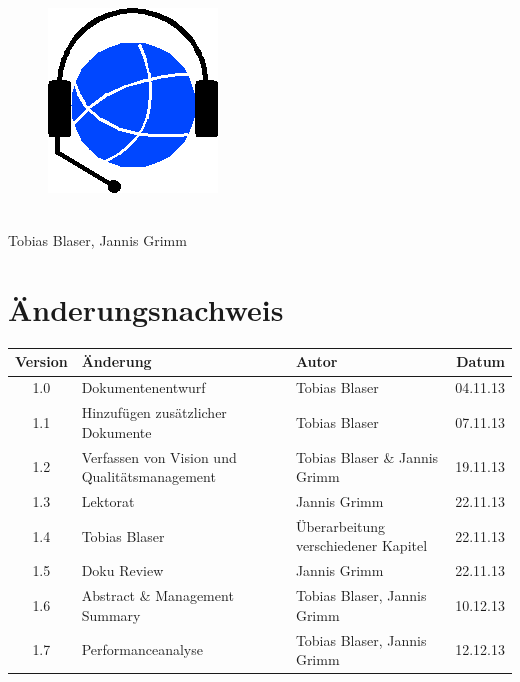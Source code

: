 
\usepackage{csvsimple}

\providecommand{\documentType}{Projektdokumentation}
\providecommand{\versionnumber}{1.7}



\thispagestyle{empty}
\begin{titlepage}
	\begin{center}

	\vspace*{40mm}
	
	\begin{figure}[htp]
		\centering
		\includegraphics[scale=0.60]{../img/icon-js-voip.png}
	\end{figure}		
	\vspace*{20mm}
	
	{\fontsize{40}{48} \selectfont \project \\[10mm]}
	\vspace*{20mm}
	Tobias Blaser, Jannis Grimm

\end{center}
\end{titlepage}
\clearpage

\chapter*{Änderungsnachweis}
\begin{tabularx}{\textwidth}{|cXlr|} %
		\hline
		\textbf{Version} & \textbf{Änderung} & \textbf{Autor} & \textbf{Datum}\\
		\hline
		1.0 & Dokumentenentwurf & Tobias Blaser & 04.11.13\\
		1.1 & Hinzufügen zusätzlicher Dokumente & Tobias Blaser & 07.11.13\\
		1.2 & Verfassen von Vision und Qualitätsmanagement & Tobias Blaser \& Jannis Grimm & 19.11.13\\
		1.3 & Lektorat & Jannis Grimm & 22.11.13\\
		1.4 & Tobias Blaser & Überarbeitung verschiedener Kapitel & 22.11.13\\
		1.5 & Doku Review & Jannis Grimm & 22.11.13\\
		1.6 & Abstract \& Management Summary & Tobias Blaser, Jannis Grimm & 10.12.13\\
		\versionnumber & Performanceanalyse & Tobias Blaser, Jannis Grimm & 12.12.13\\
		\hline
\end{tabularx}

